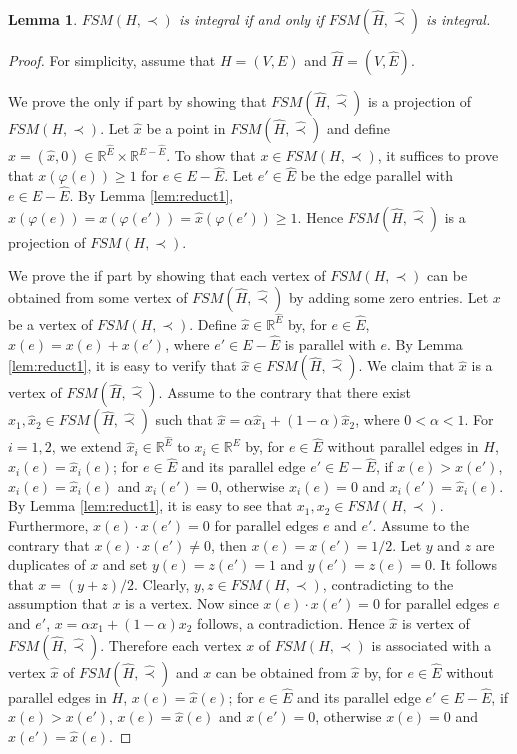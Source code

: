 \documentclass[11pt]{article}
\newtheorem{lemma}[theorem]{Lemma}
\numberwithin{theorem}{section}
\begin{document}
\begin{lemma}
\label{lem:reduct4}
$FSM(H,\prec)$ is integral if and only if $FSM(\hat{H},\hat\prec)$ is integral.
\end{lemma}
\begin{proof}
For simplicity, assume that $H=(V,E)$ and $\hat{H}=(V,\hat{E})$.

We prove the only if part by showing that $FSM(\hat{H},\hat\prec)$ is a projection of $FSM(H,\prec)$. 
Let $\hat{x}$ be a point in $FSM(\hat{H},\hat\prec)$ and define $x=(\hat{x},0)\in \mathbb{R}^{\hat{E}}\times \mathbb{R}^{E-\hat{E}}$. To show that $x\in FSM(H,\prec)$, it suffices to prove that $x(\varphi(e))\geq 1$ for $e\in E-\hat{E}$. Let $e'\in \hat{E}$ be the edge parallel with $e\in E-\hat{E}$. By Lemma \ref{lem:reduct1}, $x(\varphi(e))=x(\varphi(e'))=\hat{x}(\varphi(e'))\geq 1$. Hence $FSM(\hat{H},\hat\prec)$ is a projection of $FSM(H,\prec)$.

We prove the if part by showing that each vertex of $FSM(H,\prec)$ can be obtained from some vertex of $FSM(\hat{H},\hat\prec)$ by adding some zero entries. Let $x$ be a vertex of $FSM(H,\prec)$. Define $\hat{x}\in \mathbb{R}^{\hat{E}}$ by, for $e\in \hat{E}$, $\hat{x}(e)=x(e)+x(e')$, where $e'\in E-\hat{E}$ is parallel with $e$. By Lemma \ref{lem:reduct1}, it is easy to verify that $\hat{x}\in FSM(\hat{H},\hat\prec)$. We claim that $\hat{x}$ is a vertex of $FSM(\hat{H},\hat\prec)$. Assume to the contrary that there exist $\hat{x}_1, \hat{x}_2 \in FSM(\hat{H},\hat\prec)$ such that $\hat{x}=\alpha \hat{x}_1+ (1-\alpha)\hat{x}_2$, where $0<\alpha<1$. For $i=1,2$, we extend $\hat{x}_i\in \mathbb{R}^{\hat{E}}$ to $x_i\in \mathbb{R}^{E}$ by, for $e\in \hat{E}$ without parallel edges in $H$, $x_i(e)=\hat{x}_i(e)$; for $e\in\hat{E}$ and its parallel edge $e'\in E-\hat{E}$, if $x(e)>x(e')$, $x_i(e)=\hat{x}_i(e)$ and $x_i(e')=0$, otherwise $x_i(e)=0$ and $x_i(e')=\hat{x}_i(e)$. By Lemma \ref{lem:reduct1}, it is easy to see that $x_1,x_2\in FSM(H,\prec)$. Furthermore, $x(e)\cdot x(e')=0$ for parallel edges $e$ and $e'$. Assume to the contrary that $x(e)\cdot x(e')\not=0$, then $x(e)=x(e')=1/2$. Let $y$ and $z$ are duplicates of $x$ and set $y (e)=z(e')=1$ and $y (e')=z(e)=0$. It follows that $x= (y + z)/2$. Clearly, $y,z\in FSM(H,\prec)$, contradicting to the assumption that $x$ is a vertex.
Now since $x(e)\cdot x(e')=0$ for parallel edges $e$ and $e'$, $x=\alpha x_1+(1-\alpha) x_2$ follows, a contradiction. Hence $\hat{x}$ is vertex of $FSM(\hat{H},\hat\prec)$. Therefore each vertex $x$ of $FSM(H,\prec)$ is associated with a vertex $\hat{x}$ of $FSM(\hat{H},\hat\prec)$ and $x$ can be obtained from $\hat{x}$ by, for $e\in \hat{E}$ without parallel edges in $H$, $x(e)=\hat{x}(e)$; for $e\in\hat{E}$ and its parallel edge $e'\in E-\hat{E}$, if $x(e)>x(e')$, $x(e)=\hat{x}(e)$ and $x(e')=0$, otherwise $x(e)=0$ and $x(e')=\hat{x}(e)$. 
\end{proof}
\end{document}

